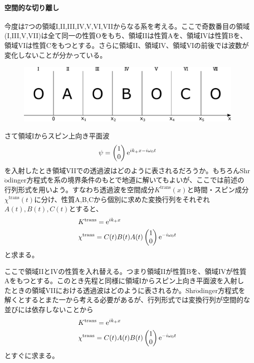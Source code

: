 \paragraph{空間的な切り離し}
今度は7つの領域I,II,III,IV,V,VI,VIIからなる系を考える。ここで奇数番目の領域(I,III,V,VII)は全て同一の性質Oをもち、領域IIは性質Aを、領域IVは性質Bを、領域VIは性質Cをもつとする。さらに領域II、領域IV、領域VIの前後では波数が変化しないことが分かっている。
\begin{figure}[H]
\centering
\includegraphics[height=3cm]{matrix/OABC.pdf}
\end{figure}
さて領域Iからスピン上向き平面波
\begin{equation}
\psi=\begin{pmatrix} 1\\0 \end{pmatrix} \mathrm{e}^{ik_+x-i\omega_0 t}
\end{equation}
を入射したとき領域VIIでの透過波はどのように表されるだろうか。もちろんShr$\ddot{\mathrm{o}}$dinger方程式を系の境界条件のもとで地道に解いてもよいが、ここでは前述の行列形式を用いよう。すなわち透過波を空間成分$K^\mathrm{trans}(x)$と時間・スピン成分$\chi^\mathrm{trans}(t)$に分け、性質A,B,Cから個別に求めた変換行列をそれぞれ$A(t),B(t),C(t)$とすると、
\begin{align}
&K^\mathrm{trans}=\mathrm{e}^{ik_+x} \\
&\chi^\mathrm{trans}=C(t)B(t)A(t) \begin{pmatrix} 1\\0 \end{pmatrix} \mathrm{e}^{-i\omega_0t}
\end{align}
と求まる。

ここで領域IIとIVの性質を入れ替える。つまり領域IIが性質Bを、領域IVが性質Aをもつとする。このとき先程と同様に領域Iからスピン上向き平面波を入射したときの領域VIIにおける透過波はどのように表されるか。Shr$\ddot{\mathrm{o}}$dinger方程式を解くとするとまた一から考える必要があるが、行列形式では変換行列が空間的な並びには依存しないことから
\begin{align}
&K^\mathrm{trans}=\mathrm{e}^{ik_+x} \\
&\chi^\mathrm{trans}=C(t)A(t)B(t) \begin{pmatrix} 1\\0 \end{pmatrix} \mathrm{e}^{-i\omega_0t}
\end{align}
とすぐに求まる。

